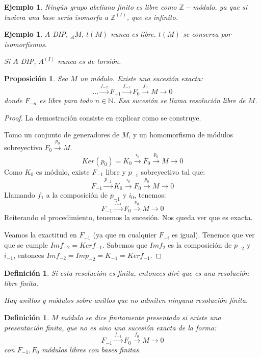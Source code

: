 \documentclass[11pt,a4paper]{article}
\theoremstyle{break}
\newtheorem{example}[theorem]{Ejemplo}
\newtheorem{definition}[theorem]{Definición}
\newtheorem{proposition}[theorem]{Proposición}
\begin{document}
\begin{example}
Ningún grupo abeliano finito es libre como $\mathbb{Z}-$módulo, ya que si tuviera una base sería isomorfa a $\mathbb{Z}^{(I)}$, que es infinito.
\end{example}

\begin{example}
$A$ DIP, $_{A}M$, $t(M)$ nunca es libre. $t(M)$ se conserva por isomorfismos.

Si $A$ DIP, $A^{(I)}$ nunca es de torsión.
\end{example}


\begin{proposition}
Sea $M$ un módulo. Existe una sucesión exacta:
$$\dots \overset{f_{-2}}{\to} F_{-1} \overset{f_{-1}}{\to} F_{0} \overset{f_{0}}{\to} M \to 0$$
donde $F_{-n}$ es libre para todo $n \in \mathbb{N}$. Esa sucesión se llama resolución libre de $M$.
\end{proposition}

\begin{proof}
La demostración consiste en explicar como se construye.

Tomo un conjunto de generadores de $M$, y un homomorfismo de módulos sobreyectivo $F_{0} \overset{p_{0}}{\to} M$.
$$Ker(p_{0}) = K_{0} \overset{i_{0}}{\to} F_{0} \overset{p_{0}}{\to} M \to 0$$
Como $K_{0}$ es módulo, existe $F_{-1}$ libre y $p_{-1}$ sobreyectivo tal que:
$$F_{-1} \overset{p_{-1}}{\to} K_{0} \overset{i_{0}}{\to} F_{0} \overset{p_{0}}{\to} M \to 0$$
Llamando $f_{1}$ a la composición de $p_{-1}$ y $i_{0}$, tenemos:
$$F_{-1} \overset{f_{-1}}{\to} F_{0} \overset{p_{0}}{\to} M \to 0$$
Reiterando el procedimiento, tenemos la sucesión. Nos queda ver que es exacta.

Veamos la exactitud en $F_{-1}$ (ya que en cualquier $F_{-i}$ es igual). Tenemos que ver que se cumple $Im f_{-2} = Ker f_{-1}$. Sabemos que $Im f_{2}$ es la composición de $p_{-2}$ y $i_{-1}$, entonces $Im f_{-2} = Im p_{-2} = K_{-1} = Ker f_{-1}$.
\end{proof}

\begin{definition}
Si esta resolución es finita, entonces diré que es una resolución libre finita.

Hay anillos y módulos sobre anillos que no admiten ninguna resolución finita.
\end{definition}

\begin{definition}
$M$ módulo se dice finitamente presentado si existe una presentación finita, que no es sino una sucesión exacta de la forma:
$$F_{-1} \overset{f_{-1}}{\to} F_{0} \overset{f_{0}}{\to} M \to 0$$
con $F_{-1}, F_{0}$ módulos libres con bases finitas.
\end{definition}
\end{document}
